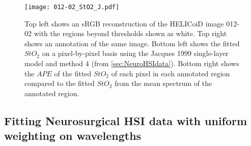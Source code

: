 \begin{figure}[h!]
    \centering 
    \texttt{[image: 012-02\_StO2\_J.pdf]}
    \caption{Top left shows an sRGB reconstruction of the HELICoiD image 012-02 with the regions beyond thresholds shown as white. Top right shows an annotation of the same image. Bottom left shows the fitted $StO_2$ on a pixel-by-pixel basis using the Jacques 1999 single-layer model and method 4 (from \ref{sec:NeuroHSIdata}). Bottom right shows the $APE$ of the fitted $StO_2$ of each pixel in each annotated region compared to the fitted $StO_2$ from the mean spectrum of the annotated region.}
    \label{ap:HELICoiDpixelJ}
\end{figure}

\subsection{Fitting Neurosurgical HSI data with uniform weighting on wavelengths}\label{ap:Chapter5uniform}
